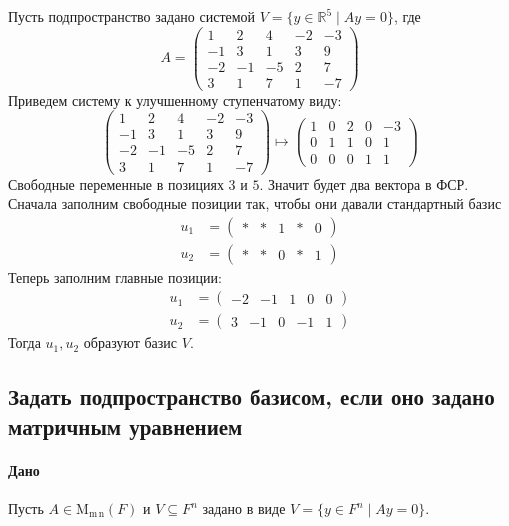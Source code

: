 \documentclass{article}
\newcommand{\MatrixDim}[3]{\operatorname{\mathrm{M}_{#2\,#3}}(#1)}
\begin{document}
Пусть подпространство задано системой $V = \{y\in \mathbb R^5 \mid Ay = 0\}$, где
\[
A =
\begin{pmatrix}
1&2&4&-2&-3\\
-1&3&1&3&9\\
-2&-1&-5&2&7\\
3&1&7&1&-7
\end{pmatrix}
\]
Приведем систему к улучшенному ступенчатому виду:
\[
\begin{pmatrix}
1&2&4&-2&-3\\
-1&3&1&3&9\\
-2&-1&-5&2&7\\
3&1&7&1&-7
\end{pmatrix}
\mapsto
\begin{pmatrix}
1&0&2&0&-3\\
0&1&1&0&1\\
0&0&0&1&1
\end{pmatrix}
\]
Свободные переменные в позициях $3$ и $5$.
Значит будет два вектора в ФСР.
Сначала заполним свободные позиции так, чтобы они давали стандартный базис
\[
\begin{aligned}
u_1 &= 
\begin{pmatrix}
{*}&{*}&{1}&{*}&{0}
\end{pmatrix}
\\
u_2 &= 
\begin{pmatrix}
{*}&{*}&{0}&{*}&{1}
\end{pmatrix}
\end{aligned}
\]
Теперь заполним главные позиции:
\[
\begin{aligned}
u_1 &= 
\begin{pmatrix}
{-2}&{-1}&{1}&{0}&{0}
\end{pmatrix}
\\
u_2 &= 
\begin{pmatrix}
{3}&{-1}&{0}&{-1}&{1}
\end{pmatrix}
\end{aligned}
\]
Тогда $u_1, u_2$ образуют базис $V$.

\subsection{Задать подпространство базисом, если оно задано матричным уравнением}

\paragraph{Дано}

Пусть $A\in\MatrixDim{F}{m}{n}$ и $V\subseteq F^{n}$ задано в виде $V = \{y\in F^{n}\mid A y = 0\}$.
\end{document}
